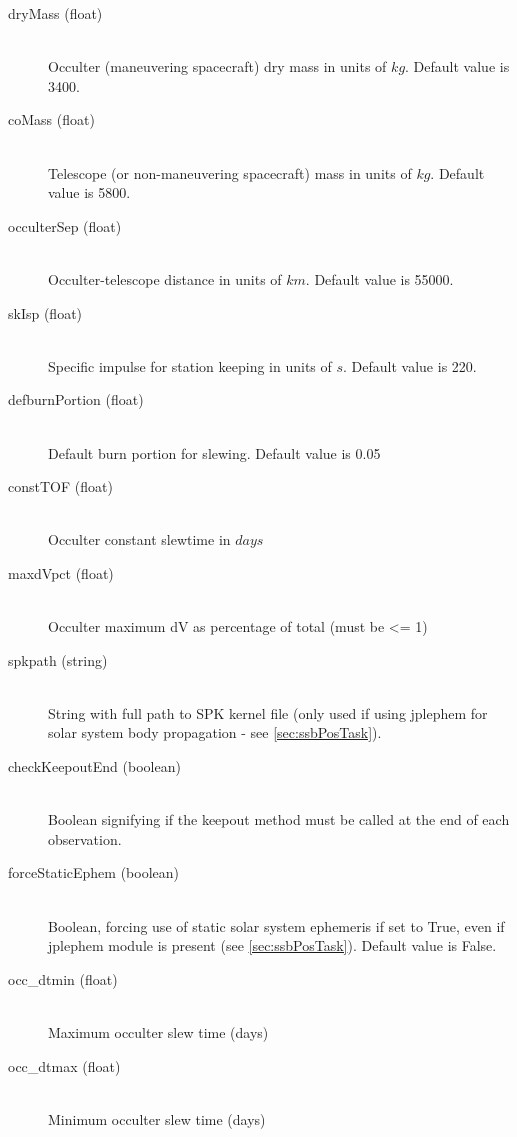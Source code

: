 \documentclass[cleanfoot]{asme2ej}
\begin{document}
\begin{itemize}
\begin{description}
    \item[dryMass (float)] \hfill \\ Occulter (maneuvering spacecraft) dry mass in units of $ kg $. Default value is 3400.
    \item[coMass (float)] \hfill \\ Telescope (or non-maneuvering spacecraft) mass in units of $ kg $. Default value is 5800.
    \item[occulterSep (float)] \hfill \\ Occulter-telescope distance in units of $ km $. Default value is 55000.
    \item[skIsp (float)] \hfill \\ Specific impulse for station keeping in units of $ s $. Default value is 220.
    \item[defburnPortion (float)] \hfill \\ Default burn portion for slewing. Default value is 0.05
    \item[constTOF (float)] \hfill \\ Occulter constant slewtime in $ days $
    \item[maxdVpct (float)] \hfill \\ Occulter maximum dV as percentage of total (must be <= 1)
    \item[spkpath (string)] \hfill\\ String with full path to SPK kernel file (only used if using jplephem for solar system body propagation - see \ref{sec:ssbPosTask}).
    \item[checkKeepoutEnd (boolean)] \hfill \\ Boolean signifying if the keepout method must be called at the end of each observation.
    \item[forceStaticEphem (boolean)] \hfill \\ Boolean, forcing use of static solar system ephemeris if set to True, even if jplephem module is present (see \ref{sec:ssbPosTask}).  Default value is False.
    \item[occ\_dtmin (float)] \hfill \\ Maximum occulter slew time (days)
    \item[occ\_dtmax (float)] \hfill \\ Minimum occulter slew time (days)
\end{description}
\end{itemize}
\end{document}
